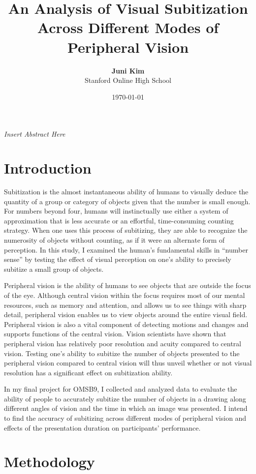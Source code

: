 \documentclass[12pt]{article}
\title{An Analysis of Visual Subitization Across Different Modes of Peripheral
Vision}
\author{\textbf{Juni Kim} \\
Stanford Online High School}
\date{\today}
\begin{document}
 

\maketitle

\textit{Insert Abstract Here}

\section{Introduction}

Subitization is the almost instantaneous ability of humans to visually deduce
the quantity of a group or category of objects given that the number is small
enough. For numbers beyond four, humans will instinctually use either a
system of approximation that is less accurate or an effortful, time-consuming
counting strategy. When one uses this process of subitizing, they are able to
recognize the numerosity of objects without counting, as if it were an
alternate form of perception.  In this study, I examined the human’s
fundamental skills in “number sense” by testing the effect of visual perception
on one’s ability to precisely subitize a small group of objects. 

Peripheral vision is the ability of humans to see objects that are outside the
focus of the eye. Although central vision within the focus requires most of our
mental resources, such as memory and attention, and allows us to see things
with sharp detail, peripheral vision enables us to view objects around the
entire visual field. Peripheral vision is also a vital component of detecting
motions and changes and supports functions of the central vision. Vision
scientists have shown that peripheral vision has relatively poor resolution and
acuity compared to central vision. Testing one’s ability to subitize the number
of objects presented to the peripheral vision compared to central vision will
thus unveil whether or not visual resolution has a significant effect on
subitization ability.

In my final project for OMSB9, I collected and analyzed data to evaluate the
ability of people to accurately subitize the number of objects in a drawing
along different angles of vision and the time in which an image was presented.
I intend to find the accuracy of subitizing across different modes of
peripheral vision and effects of the presentation duration on participants'
performance.

\section{Methodology}
\end{document}
